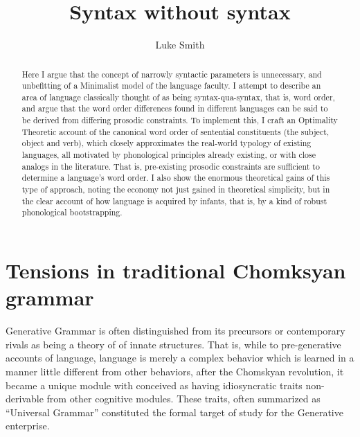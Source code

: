 \documentclass{article}
\title{Syntax without syntax}
\author{Luke Smith}
\begin{document}
\maketitle

\begin{abstract}
Here I argue that the concept of narrowly syntactic parameters is unnecessary, and unbefitting of a Minimalist model of the language faculty.
I attempt to describe an area of language classically thought of as being syntax-qua-syntax, that is, word order, and argue that the word order differences found in different languages can be said to be derived from differing prosodic constraints.
To implement this, I craft an Optimality Theoretic account of the canonical word order of sentential constituents (the subject, object and verb), which closely approximates the real-world typology of existing languages, all motivated by phonological principles already existing, or with close analogs in the literature.
That is, pre-existing prosodic constraints are sufficient to determine a language's word order.
I also show the enormous theoretical gains of this type of approach, noting the economy not just gained in theoretical simplicity, but in the clear account of how language is acquired by infants, that is, by a kind of robust phonological bootstrapping.
\end{abstract}

\tableofcontents

\listoffigures

\section{Tensions in traditional Chomksyan grammar}

Generative Grammar is often distinguished from its precursors or contemporary rivals as being a theory of of innate structures.
That is, while to pre-generative accounts of language, language is merely a complex behavior which is learned in a manner little different from other behaviors, after the Chomskyan revolution, it became a unique module with conceived as having idiosyncratic traits non-derivable from other cognitive modules.
These traits, often summarized as ``Universal Grammar'' constituted the formal target of study for the Generative enterprise.
\end{document}
